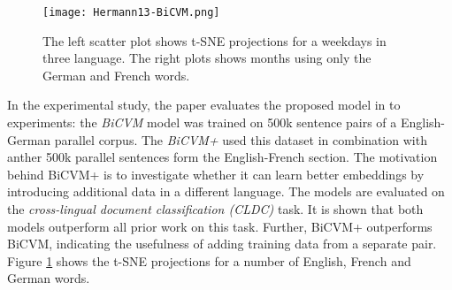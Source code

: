 \begin{figure}[h]
  \centering
  \texttt{[image: Hermann13-BiCVM.png]}\\
  \caption{The left scatter plot shows t-SNE projections for a weekdays in three language. The right plots shows months using only the German and French words.}\label{fig:Hermann13-BiCVM}
\end{figure}

In the experimental study, the paper evaluates the proposed model in to experiments: the \emph{BiCVM} model was trained on 500k sentence pairs of a English-German parallel corpus. The \emph{BiCVM+} used this dataset in combination with anther 500k parallel sentences form the English-French section. The motivation behind BiCVM+ is to investigate whether it can learn better embeddings by introducing additional data in a different language. The models are evaluated on the \emph{cross-lingual document classification (CLDC)} task. It is shown that both models outperform all prior work on this task. Further, BiCVM+ outperforms BiCVM, indicating the usefulness of adding training data from a separate pair. Figure \ref{fig:Hermann13-BiCVM} shows the t-SNE projections for a number of English, French and German words.
